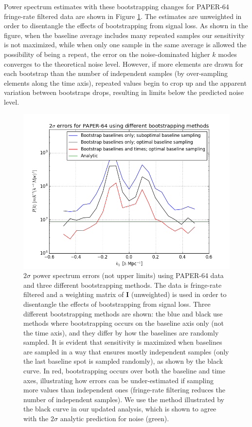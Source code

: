 \documentclass[preprint2,numberedappendix,tighten]{aastex6}  %
\begin{document}
Power spectrum estimates with these bootstrapping changes for PAPER-64 fringe-rate filtered data are shown in Figure 
\ref{fig:data_errors}. The estimates are unweighted in order to disentangle the effects of bootstrapping from signal loss. As 
shown in the figure, when the baseline average includes many repeated samples our sensitivity is not maximized, while when 
only one sample in the same average is allowed the possibility of being a repeat, the error on the noise-dominated higher $k$ 
modes converges to the theoretical noise level.  However, if more elements are drawn for each bootstrap than the number of 
independent samples (by over-sampling elements along the time axis), repeated values begin to crop up and the apparent 
variation between bootstraps drops, resulting in limits below the predicted noise level.

\begin{figure}
	\centering
	\includegraphics[trim={0.3cm 0.3cm 0.3cm 0.3cm},width=\columnwidth]{plots/data_errors.png}
	\caption{$2\sigma$ power spectrum errors (not upper limits) using PAPER-64 data and three different bootstrapping 
methods. The data is fringe-rate filtered and a weighting matrix of $\textbf{I}$ (unweighted) is used in order to disentangle the 
effects of bootstrapping from signal loss. Three different bootstrapping methods are shown: the blue and black use methods 
where bootstrapping occurs on the baseline axis only (not the time axis), and they differ by how the baselines are randomly 
sampled. It is evident that sensitivity is maximized when baselines are sampled in a way that ensures mostly independent 
samples (only the last baseline spot is sampled randomly), as shown by the black curve. In red, bootstrapping occurs over both 
the baseline and time axes, illustrating how errors can be under-estimated if sampling more values than independent ones 
(fringe-rate filtering reduces the number of independent samples). We use the method illustrated by the black curve in our 
updated analysis, which is shown to agree with the $2\sigma$ analytic prediction for noise (green).}
	\label{fig:data_errors}
\end{figure}
\end{document}
